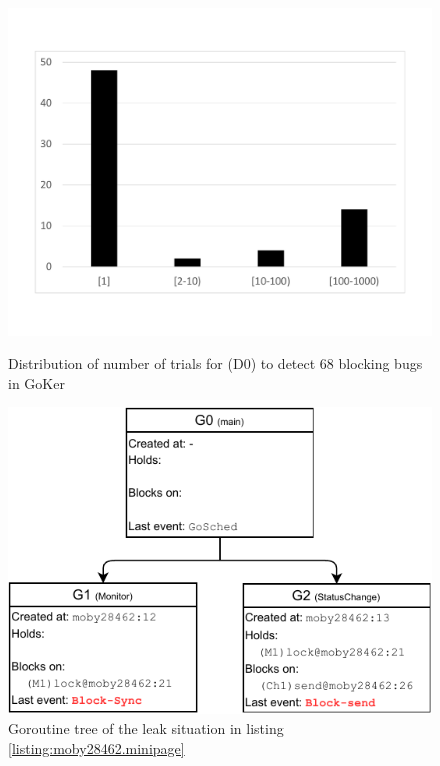 \begin{figure}[t]
\begin{minipage}{.49\textwidth}
\centering
\includegraphics[width=0.9\linewidth]{goat/figs/coverage_motivation.pdf}
\caption{Distribution of number of trials for \goat (D0) to detect 68 blocking bugs in GoKer~\cite{yuan-gobench-cgo21}}
\label{fig:rare_bugs}
\end{minipage}
\begin{minipage}{.49\textwidth}
\centering
\includegraphics[width=0.9\linewidth]{goat/figs/gtree.pdf}
\caption{Goroutine tree of the leak situation in listing \ref{listing:moby28462.minipage}}
\label{fig:gtree}
\end{minipage}
\end{figure}


